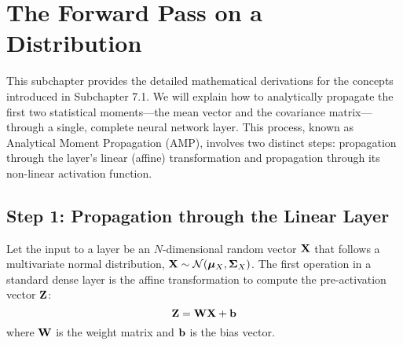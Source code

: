 \ifdefined\ispartofbook
\else
  
  
\fi


\section{The Forward Pass on a Distribution}
\label{sec:forward_pass_distribution}

This subchapter provides the detailed mathematical derivations for the concepts introduced in Subchapter 7.1. We will explain how to analytically propagate the first two statistical moments—the mean vector and the covariance matrix—through a single, complete neural network layer. This process, known as Analytical Moment Propagation (AMP), involves two distinct steps: propagation through the layer's linear (affine) transformation and propagation through its non-linear activation function.

\subsection{Step 1: Propagation through the Linear Layer}
Let the input to a layer be an $N$-dimensional random vector $\mathbf{X}$ that follows a multivariate normal distribution, $\mathbf{X} \sim \mathcal{N}(\boldsymbol{\mu}_X, \boldsymbol{\Sigma}_X)$. The first operation in a standard dense layer is the affine transformation to compute the pre-activation vector $\mathbf{Z}$:
\begin{equation}
    \mathbf{Z} = \mathbf{W}\mathbf{X} + \mathbf{b}
\end{equation}
where $\mathbf{W}$ is the weight matrix and $\mathbf{b}$ is the bias vector.

